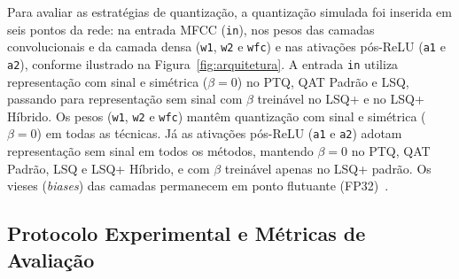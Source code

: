 Para avaliar as estratégias de quantização, a quantização simulada foi inserida em seis pontos da rede: na entrada MFCC (\texttt{in}), nos pesos das camadas convolucionais e da camada
densa (\texttt{w1}, \texttt{w2} e \texttt{wfc}) e nas ativações pós-ReLU (\texttt{a1} e \texttt{a2}), conforme ilustrado na Figura~\ref{fig:arquitetura}. A entrada \texttt{in} utiliza
representação com sinal e simétrica ($\beta = 0$) no PTQ, QAT Padrão e LSQ, passando para representação sem sinal com $\beta$ treinável no LSQ+ e no LSQ+ Híbrido. Os pesos    
(\texttt{w1}, \texttt{w2} e \texttt{wfc}) mantêm quantização com sinal e simétrica ($\beta = 0$) em todas as técnicas. Já as ativações pós-ReLU (\texttt{a1} e \texttt{a2}) adotam 
representação sem sinal em todos os métodos, mantendo $\beta = 0$ no PTQ, QAT Padrão, LSQ e LSQ+ Híbrido, e com $\beta$ treinável apenas no LSQ+ padrão. Os vieses (\textit{biases}) 
das camadas permanecem em ponto flutuante (FP32)~\cite{nagel2021}.

\subsection{Protocolo Experimental e Métricas de Avaliação}
